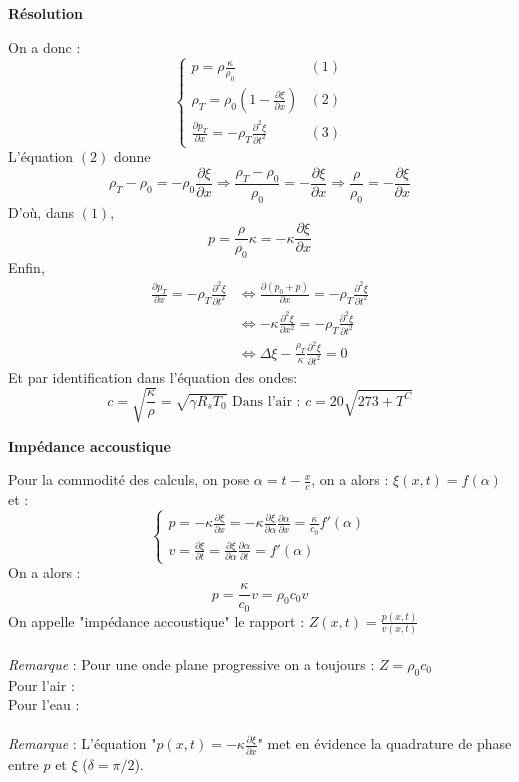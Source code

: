 \noindent\textbf{Résolution}

\noindent On a donc : 
\[
\left \{
\begin{array}{ll}
p=\rho\frac{\kappa}{\rho_0} & (1) \\
\rho_T=\rho_0(1-\frac{\partial\xi}{\partial x}) & (2) \\
\frac{\partial p_T}{\partial x} = -\rho_T\frac{\partial^2\xi}{\partial t^2} & (3)
\end{array}
\right.
\]
L'équation $(2)$ donne 
\[\rho_T-\rho_0=-\rho_0\frac{\partial \xi}{\partial x} \Rightarrow \frac{\rho_T-\rho_0}{\rho_0}=-\frac{\partial\xi}{\partial x}
\Rightarrow \frac{\rho}{\rho_0}=-\frac{\partial\xi}{\partial x}\]
D'où, dans $(1)$, \[p=\frac{\rho}{\rho_0}\kappa=-\kappa\frac{\partial\xi}{\partial x}\]
Enfin,
\[
\begin{array}{ll}
\frac{\partial p_T}{\partial x}=-\rho_T\frac{\partial^2\xi}{\partial t^2} & 
\Leftrightarrow \frac{\partial(p_0+p)}{\partial x}=-\rho_T\frac{\partial^2\xi}{\partial t^2} \\
& \Leftrightarrow -\kappa\frac{\partial^2\xi}{\partial x^2}=-\rho_T\frac{\partial^2\xi}{\partial t^2} \\
& \Leftrightarrow \Delta\xi-\frac{\rho_T}{\kappa}\frac{\partial^2\xi}{\partial t^2}=0
\end{array}
\]
Et par identification dans l'équation des ondes: 
\[c=\sqrt{\frac{\kappa}{\rho}}=\sqrt{\gamma R_s T_0} \textrm{  Dans l'air :  }c = 20\sqrt{273+T^C}  \]

\noindent\textbf{Impédance accoustique}

Pour la commodité des calculs, on pose $\alpha=t-\frac{x}{c}$, on a alors : $\xi(x,t)=f(\alpha)$ et :
\[
\left \{
\begin{array}{l}
p=-\kappa\frac{\partial \xi}{\partial x}=-\kappa\frac{\partial\xi}{\partial\alpha}\frac{\partial\alpha}{\partial x}=\frac{\kappa}{c_0}f'(\alpha) \\
v=\frac{\partial\xi}{\partial t} = \frac{\partial\xi}{\partial\alpha}\frac{\partial\alpha}{\partial t} = f'(\alpha)
\end{array}
\right.
\]
On a alors : \[p=\frac{\kappa}{c_0}v=\rho_0c_0v\]
On appelle "impédance accoustique" le rapport : $Z(x,t)=\frac{p(x,t)}{v(x,t)}$\\\\
\emph{Remarque} : Pour une onde plane progressive on a toujours : $Z=\rho_0c_0$\\
Pour l'air : \\
Pour l'eau : \\
\\
\emph{Remarque} : L'équation "$p(x,t)=-\kappa\frac{\partial\xi}{\partial x}$" met en évidence la quadrature de phase entre $p$ et $\xi$ ($\delta=\pi/2$).\\

